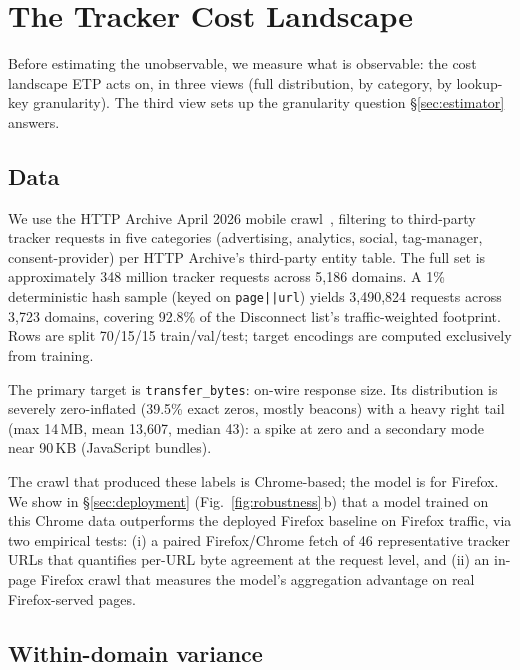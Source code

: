 \documentclass[10pt,sigconf,letterpaper,anonymous]{acmart}
\newcommand{\numrequests}{3{,}490{,}824\xspace}
\newcommand{\numdomains}{3{,}723\xspace}
\begin{document}
\section{The Tracker Cost Landscape}
\label{sec:landscape}

Before estimating the unobservable, we measure what is observable: the cost landscape ETP acts on, in three views (full distribution, by category, by lookup-key granularity).
The third view sets up the granularity question \S\ref{sec:estimator} answers.

\subsection{Data}

We use the HTTP Archive April 2026 mobile crawl~\cite{httparchive}, filtering to third-party tracker requests in five categories (advertising, analytics, social, tag-manager, consent-provider) per HTTP Archive's third-party entity table.
The full set is approximately 348 million tracker requests across 5,186 domains.
A 1\% deterministic hash sample (keyed on \texttt{page||url}) yields \numrequests requests across \numdomains domains, covering 92.8\% of the Disconnect list's traffic-weighted footprint.
Rows are split 70/15/15 train/val/test; target encodings are computed exclusively from training.

The primary target is \texttt{transfer\_bytes}: on-wire response size.
Its distribution is severely zero-inflated (39.5\% exact zeros, mostly beacons) with a heavy right tail (max 14\,MB, mean 13,607, median 43): a spike at zero and a secondary mode near 90\,KB (JavaScript bundles).

The crawl that produced these labels is Chrome-based; the model is for Firefox. We show in \S\ref{sec:deployment} (Fig.~\ref{fig:robustness}\,b) that a model trained on this Chrome data outperforms the deployed Firefox baseline on Firefox traffic, via two empirical tests: (i) a paired Firefox/Chrome fetch of 46 representative tracker URLs that quantifies per-URL byte agreement at the request level, and (ii) an in-page Firefox crawl that measures the model's aggregation advantage on real Firefox-served pages.

\subsection{Within-domain variance}
\end{document}
